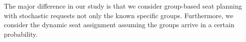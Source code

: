 The major difference in our study is that we consider group-based seat planning with stochastic requests not only the known specific groups. Furthermore, we consider the dynamic seat assignment assuming the groups arrive in a certain probability.








